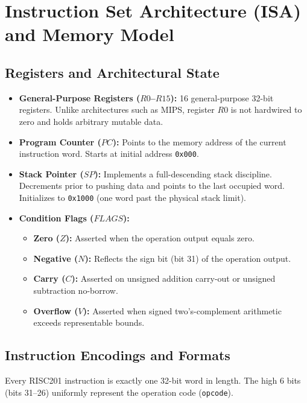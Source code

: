 \documentclass[11pt,a4paper]{article}
\begin{document}
\section{Instruction Set Architecture (ISA) and Memory Model}

\subsection{Registers and Architectural State}
\begin{itemize}
    \item \textbf{General-Purpose Registers ($R0$--$R15$):} 16 general-purpose 32-bit registers. Unlike architectures such as MIPS, register $R0$ is not hardwired to zero and holds arbitrary mutable data.
    \item \textbf{Program Counter ($PC$):} Points to the memory address of the current instruction word. Starts at initial address \texttt{0x000}.
    \item \textbf{Stack Pointer ($SP$):} Implements a full-descending stack discipline. Decrements prior to pushing data and points to the last occupied word. Initializes to \texttt{0x1000} (one word past the physical stack limit).
    \item \textbf{Condition Flags ($FLAGS$):}
    \begin{itemize}
        \item \textbf{Zero ($Z$):} Asserted when the operation output equals zero.
        \item \textbf{Negative ($N$):} Reflects the sign bit (bit 31) of the operation output.
        \item \textbf{Carry ($C$):} Asserted on unsigned addition carry-out or unsigned subtraction no-borrow.
        \item \textbf{Overflow ($V$):} Asserted when signed two's-complement arithmetic exceeds representable bounds.
    \end{itemize}
\end{itemize}

\subsection{Instruction Encodings and Formats}
Every RISC201 instruction is exactly one 32-bit word in length. The high 6 bits (bits 31--26) uniformly represent the operation code (\texttt{opcode}).
\end{document}
